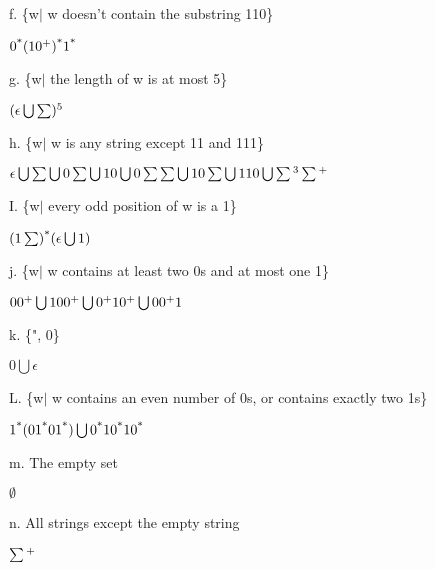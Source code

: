 \documentclass[12pt]{article}
\begin{document}
\noindent
f. \{w$|$ w doesn’t contain the substring 110\}
\begin{center} $0\textsuperscript{*}(10\textsuperscript{+})\textsuperscript{*}1\textsuperscript{*}$
\end{center}

\clearpage
\noindent
g. \{w$|$ the length of w is at most 5\}
\begin{center} $(\epsilon\bigcup\sum)\textsuperscript{5}$ \end{center}

\noindent
h. \{w$|$ w is any string except 11 and 111\} 
\begin{center} 
$\epsilon \bigcup \sum \bigcup 0 \sum \bigcup 10 \bigcup 0 \sum\sum \bigcup 10\sum \bigcup 110 \bigcup \sum \textsuperscript{3} \sum \textsuperscript{+} $
\end{center}

\noindent
I. \{w$|$ every odd position of w is a 1\}
\begin{center} 
$(1 \sum) \textsuperscript{*}(\epsilon \bigcup 1) $
\end{center}

\noindent
j. \{w$|$ w contains at least two 0s and at most one 1\}
\begin{center} 
$00 \textsuperscript{+} \bigcup 100 \textsuperscript{+} \bigcup 0 \textsuperscript{+}
 10 \textsuperscript{+} \bigcup 00 \textsuperscript{+} 1 $
\end{center}

\noindent
k. \{", 0\}
\begin{center} $ 0 \bigcup \epsilon $ \end{center}

\noindent
L. \{w$|$ w contains an even number of 0s, or contains exactly two 1s\}
\begin{center}
$ 1 \textsuperscript{*} (01\textsuperscript{*}01\textsuperscript{*}) \bigcup 0 
     \textsuperscript{*} 10 \textsuperscript{*} 10 \textsuperscript{*} $
\end{center}

\noindent
m. The empty set
\begin{center} $ \emptyset $ \end{center}

\noindent
n. All strings except the empty string
\begin{center} $ \sum \textsuperscript{+} $ \end{center}

\end{document}
